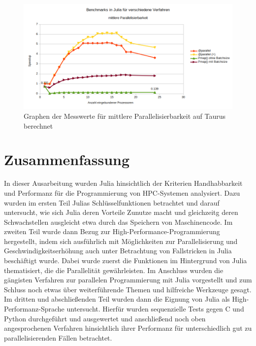 \documentclass[proseminar,german,utf8]{zihpub}
\begin{document}
\begin{figure}
    \centering
    \includegraphics[scale=0.8, width=17cm]{bilder/parallel_performance_taurus_medium}
    \caption{Graphen der Messwerte für mittlere Parallelisierbarkeit auf Taurus berechnet}
    \label{fig:taurusMedium}
\end{figure}
\newpage
\section{Zusammenfassung}

In dieser Ausarbeitung wurden Julia hinsichtlich der Kriterien Handhabbarkeit und Performanz für die Programmierung von HPC-Systemen analysiert. Dazu wurden im ersten Teil Julias Schlüsselfunktionen betrachtet und darauf untersucht, wie sich Julia deren Vorteile Zunutze macht und gleichzeitg deren Schwachstellen ausgleicht etwa durch das Speichern von Maschinencode. Im zweiten Teil wurde  dann Bezug zur High-Performance-Programmierung hergestellt, indem sich ausführlich mit Möglichkeiten zur Parallelisierung und Geschwindigkeitserhöhung auch unter Betrachtung von Fallstricken in Julia beschäftigt wurde. Dabei wurde zuerst die Funktionen im Hintergrund von Julia thematisiert, die die Parallelität gewährleisten. Im Anschluss wurden die gängisten Verfahren zur parallelen Programmierung mit Julia vorgestellt und zum Schluss noch etwas über weiterführende Themen und hilfreiche Werkzeuge gesagt. Im dritten und abschließenden Teil wurden dann die Eignung von Julia als High-Performanz-Sprache untersucht. Hierfür wurden sequenzielle Tests gegen C und Python durchgeführt und ausgewertet und anschließend noch oben angesprochenen Verfahren hinsichtlich ihrer Performanz für unterschiedlich gut zu parallelisierenden Fällen betrachtet. 
\end{document}
